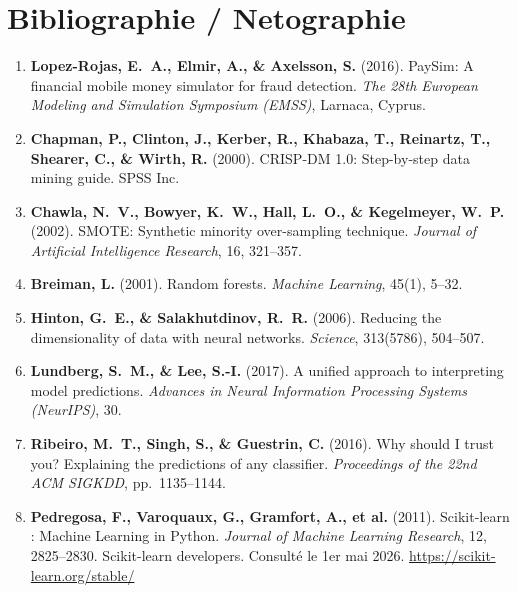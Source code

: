 \documentclass[12pt,a4paper,twoside]{report}
\begin{document}
\chapter*{Bibliographie / Netographie}

\begin{enumerate}

  \item \textbf{Lopez-Rojas, E.~A., Elmir, A., \& Axelsson, S.} (2016). PaySim: A financial mobile money simulator for fraud detection. \textit{The 28th European Modeling and Simulation Symposium (EMSS)}, Larnaca, Cyprus.

  \item \textbf{Chapman, P., Clinton, J., Kerber, R., Khabaza, T., Reinartz, T., Shearer, C., \& Wirth, R.} (2000). CRISP-DM 1.0: Step-by-step data mining guide. SPSS Inc.

  \item \textbf{Chawla, N.~V., Bowyer, K.~W., Hall, L.~O., \& Kegelmeyer, W.~P.} (2002). SMOTE: Synthetic minority over-sampling technique. \textit{Journal of Artificial Intelligence Research}, 16, 321--357.

  \item \textbf{Breiman, L.} (2001). Random forests. \textit{Machine Learning}, 45(1), 5--32.

  \item \textbf{Hinton, G.~E., \& Salakhutdinov, R.~R.} (2006). Reducing the dimensionality of data with neural networks. \textit{Science}, 313(5786), 504--507.

  \item \textbf{Lundberg, S.~M., \& Lee, S.-I.} (2017). A unified approach to interpreting model predictions. \textit{Advances in Neural Information Processing Systems (NeurIPS)}, 30.

  \item \textbf{Ribeiro, M.~T., Singh, S., \& Guestrin, C.} (2016). Why should I trust you? Explaining the predictions of any classifier. \textit{Proceedings of the 22nd ACM SIGKDD}, pp.~1135--1144.

  \item \textbf{Pedregosa, F., Varoquaux, G., Gramfort, A., et al.} (2011). Scikit-learn : Machine Learning in Python. \textit{Journal of Machine Learning Research}, 12, 2825--2830. Scikit-learn developers. Consulté le 1er mai 2026. \url{https://scikit-learn.org/stable/}


\end{enumerate}
\end{document}
